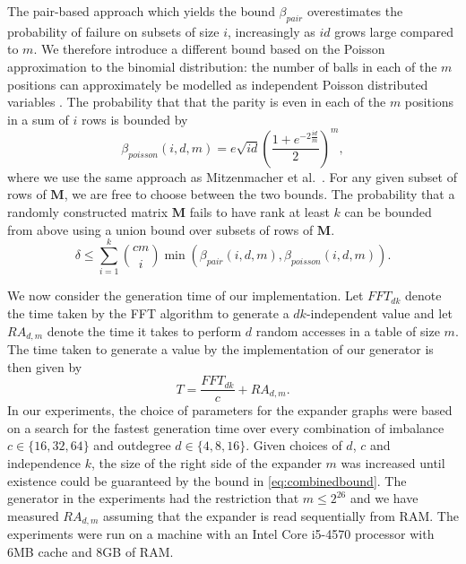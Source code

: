 \documentclass[a4paper,11pt]{article}
\theoremstyle{plain}
\theoremstyle{definition}
\newcommand{\mat}[1]{\mathbf{#1}}
\begin{document}
The pair-based approach which yields the bound $\beta_{pair}$ overestimates the probability of failure on subsets of size $i$, increasingly as $id$ grows large compared to $m$. 
We therefore introduce a different bound based on the Poisson approximation to the binomial distribution: 
the number of balls in each of the $m$ positions can approximately be modelled as independent Poisson distributed variables \cite[Ch. 5.4]{mitzenmacher2005}. 
The probability that that the parity is even in each of the $m$ positions in a sum of $i$ rows is bounded by
\begin{equation}
\beta_{poisson}(i, d, m) = e\sqrt{id}\left(\frac{1+e^{-2\frac{id}{m}}}{2}\right)^{m}, \label{eq:poibound} 
\end{equation}
where we use the same approach as Mitzenmacher et al.~\cite{mitzenmacher2014}.
For any given subset of rows of $\mat{M}$, we are free to choose between the two bounds. 
The probability that a randomly constructed matrix $\mat{M}$ fails to have rank at least $k$ can be bounded from above using a union bound over subsets of rows of $\mat{M}$.
\begin{equation}
\delta \leq \sum_{i=1}^{k}\binom{cm}{i}\min(\beta_{pair}(i, d, m), \beta_{poisson}(i, d, m)). \label{eq:combinedbound}
\end{equation}

We now consider the generation time of our implementation. 
Let $FFT_{dk}$ denote the time taken by the FFT algorithm to generate a $dk$-independent value and let $RA_{d,m}$ denote the time it takes to perform $d$ random accesses in a table of size $m$.  
The time taken to generate a value by the implementation of our generator is then given by
\begin{equation}
T = \frac{FFT_{dk}}{c} + RA_{d,m}. \label{eq:generationtime}
\end{equation}
In our experiments, the choice of parameters for the expander graphs were based on a search for the fastest generation time over every combination of imbalance $c \in \{16, 32, 64 \}$ and outdegree $d \in \{ 4, 8, 16 \}$.
Given choices of $d$, $c$ and independence $k$, the size of the right side of the expander $m$ was increased until existence could be guaranteed by the bound in \eqref{eq:combinedbound}.
The generator in the experiments had the restriction that $m \leq 2^{26}$ and we have measured $RA_{d,m}$ assuming that
the expander is read sequentially from RAM. 
The experiments were run on a machine with an Intel Core i5-4570 processor with 6MB cache and 8GB of RAM.
\end{document}
